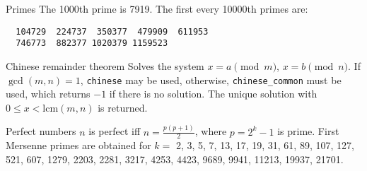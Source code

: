 \clearpage
{}
\categorycontents{}


\begin{algorithm}{Primes}
\desc
The 1000th prime is 7919. The first every 10000th primes are: {\small
\begin{verbatim}
  104729  224737  350377  479909  611953
  746773  882377 1020379 1159523
\end{verbatim}
}\end{algorithm}





\begin{algorithm}{Chinese remainder theorem}
\desc
Solves the system $x = a \pmod m$, $x = b \pmod n$.  If $\gcd(m,n) =
1$, {\tt chinese} may be used, otherwise, {\tt chinese\_common} must be
used, which returns $-1$ if there is no solution.  The unique solution
with $0 \le x < \mathrm{lcm}(m, n)$ is returned.
\end{algorithm}


\begin{algorithm}{Perfect numbers}
\label{perfnum}
\desc
$n$ is perfect iff $n = \frac{p(p+1)}{2}$, where $p = 2^k-1$ is prime.
First Mersenne primes are obtained for $k =$ 2, 3, 5, 7, 13, 17, 19,
31, 61, 89, 107, 127, 521, 607, 1279, 2203, 2281, 3217, 4253, 4423,
9689, 9941, 11213, 19937, 21701.\\
\end{algorithm}

